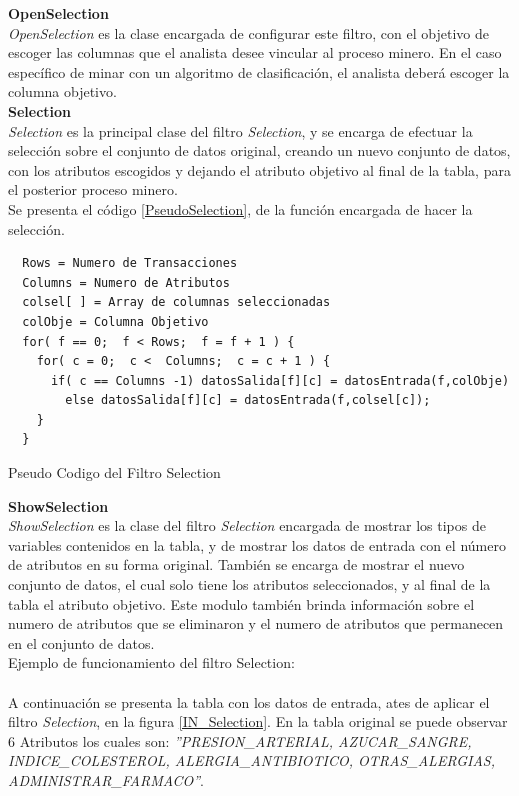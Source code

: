 \textbf{OpenSelection} \\
\textit{OpenSelection} es la clase encargada de configurar este filtro, con el objetivo de escoger las columnas que el analista desee vincular al proceso minero. En el caso espec\'ifico de minar con un algoritmo de clasificaci\'on, el analista deber\'a escoger la columna objetivo.\\

\textbf{Selection} \\
\textit{Selection} es la principal clase del filtro \textit{Selection}, y se encarga de efectuar la selecci\'on sobre el conjunto de datos original, creando un nuevo conjunto de datos,  con los atributos escogidos y dejando el atributo objetivo al final de la tabla, para el posterior proceso minero. \\
Se presenta el c\'odigo \ref{PseudoSelection}, de la funci\'on encargada de hacer la selecci\'on. \\ 

\begin{codigof}
\begin{verbatim}       
  Rows = Numero de Transacciones
  Columns = Numero de Atributos
  colsel[ ] = Array de columnas seleccionadas
  colObje = Columna Objetivo       
  for( f == 0;  f < Rows;  f = f + 1 ) {
    for( c = 0;  c <  Columns;  c = c + 1 ) {
      if( c == Columns -1) datosSalida[f][c] = datosEntrada(f,colObje)
        else datosSalida[f][c] = datosEntrada(f,colsel[c]);
    }      
  }
\end{verbatim}
\caption{Pseudo Codigo del Filtro Selection}
\label{PseudoSelection}
\end{codigof}  
 
\textbf{ShowSelection} \\
\textit{ShowSelection} es la clase del filtro \textit{Selection} encargada de mostrar los tipos de variables contenidos en la tabla, y de mostrar los datos de entrada con el n\'umero de atributos en su forma original. Tambi\'en se encarga de mostrar el nuevo conjunto de datos, el cual solo tiene los atributos seleccionados, y al final de la tabla el atributo objetivo. Este modulo tambi\'en brinda informaci\'on sobre el numero de atributos que se eliminaron y el numero de atributos que permanecen en el conjunto de datos.\\
Ejemplo de funcionamiento del filtro Selection:\\ \\
A continuaci\'on se presenta la tabla con los datos de entrada, ates de aplicar el filtro \textit{Selection}, en la figura \ref{IN_Selection}.  En la tabla original se puede observar 6 Atributos los cuales son: \textit{''PRESION\_ARTERIAL, AZUCAR\_SANGRE, INDICE\_COLESTEROL, ALERGIA\_ANTIBIOTICO, OTRAS\_ALERGIAS, ADMINISTRAR\_FARMACO''}.
 
